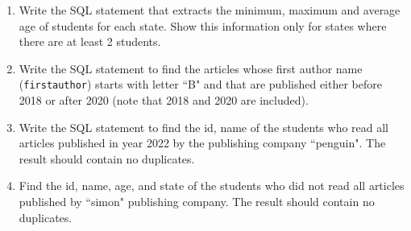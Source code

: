 \documentclass[letterpaper, 11pt]{article}
\begin{document}
\begin{enumerate}[label={\alph*}),leftmargin=*]
    \item Write the SQL statement that extracts the minimum, maximum and average age of students for each state. Show this information only for states where there are at least 2 students.
    \item Write the SQL statement to find the articles whose first author name (\texttt{first\textunderscore author}) starts with letter ``B" and that are published either before 2018 or after 2020 (note that 2018 and 2020 are included).
    \item Write the SQL statement to find the id, name of the students who read all articles published in year 2022 by the publishing company ``penguin". The result should contain no duplicates.
    \item Find the id, name, age, and state of the students who did not read all articles published by ``simon" publishing company. The result should contain no duplicates. 
\end{enumerate}
\end{document}

